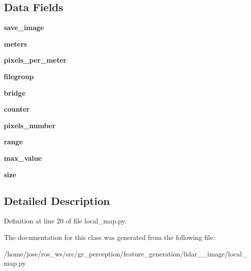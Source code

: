 \subsection*{Data Fields}
\begin{DoxyCompactItemize}
\item 
\mbox{\label{classlocal__map_1_1Lidar2Image_aff40c5fccca05d06cb6639e607f4a10d}} 
{\bfseries save\+\_\+image}
\item 
\mbox{\label{classlocal__map_1_1Lidar2Image_a45d8e48b60da20396a68d3925a5d82a0}} 
{\bfseries meters}
\item 
\mbox{\label{classlocal__map_1_1Lidar2Image_ab660782bb2aacda4d42d3117a5211b15}} 
{\bfseries pixels\+\_\+per\+\_\+meter}
\item 
\mbox{\label{classlocal__map_1_1Lidar2Image_a4ce7cbc8b3664a3860bdd7bea2792e65}} 
{\bfseries filegroup}
\item 
\mbox{\label{classlocal__map_1_1Lidar2Image_afb5604ddd311211d63bfcf2c8a92829c}} 
{\bfseries bridge}
\item 
\mbox{\label{classlocal__map_1_1Lidar2Image_a175959f8d8b23b7209e9901388940ade}} 
{\bfseries counter}
\item 
\mbox{\label{classlocal__map_1_1Lidar2Image_af4e980f5adab16f9901eddc612bb10f0}} 
{\bfseries pixels\+\_\+number}
\item 
\mbox{\label{classlocal__map_1_1Lidar2Image_a28b19743e0e2f12e3a64f702a3668795}} 
{\bfseries range}
\item 
\mbox{\label{classlocal__map_1_1Lidar2Image_a598c50aadc1028ab6feb012837dd29f9}} 
{\bfseries max\+\_\+value}
\item 
\mbox{\label{classlocal__map_1_1Lidar2Image_a24b2fe23d2fc2fc23cfcd541a9d25497}} 
{\bfseries size}
\end{DoxyCompactItemize}


\subsection{Detailed Description}


Definition at line 20 of file local\+\_\+map.\+py.



The documentation for this class was generated from the following file\+:\begin{DoxyCompactItemize}
\item 
/home/jose/ros\+\_\+ws/src/gr\+\_\+perception/feature\+\_\+generation/lidar\+\_\+\_\+image/local\+\_\+map.\+py\end{DoxyCompactItemize}
